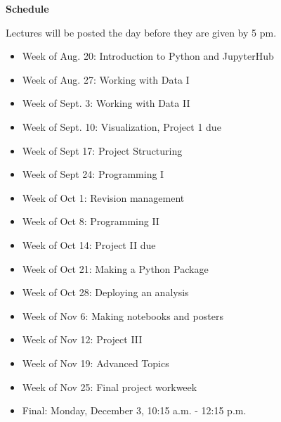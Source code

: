 \documentclass[12pt]{article}
\let\oldtextbf\textbf
\renewcommand{\textbf}[1]{\textcolor{coolblack}{\oldtextbf{#1}}}
\begin{document}
\begin{flushleft}
\textbf{Schedule}
\end{flushleft}

Lectures will be posted the day before they are given by 5 pm.

\begin{itemize}
\item Week of Aug. 20: Introduction to Python and JupyterHub
\item Week of Aug. 27: Working with Data I
\item Week of Sept. 3: Working with Data II
\item Week of Sept. 10: Visualization, Project 1 due
\item Week of Sept 17: Project Structuring 
\item Week of Sept 24: Programming I
\item Week of Oct 1: Revision management
\item Week of Oct 8: Programming II
\item Week of Oct 14: Project II due
\item Week of Oct 21: Making a Python Package
\item Week of Oct 28: Deploying an analysis
\item Week of Nov 6: Making notebooks and posters
\item Week of Nov 12: Project III
\item Week of Nov 19: Advanced Topics
\item Week of Nov 25: Final project workweek
\item Final: Monday, December 3, 10:15 a.m. - 12:15 p.m. 

\end{itemize}
\end{document}

